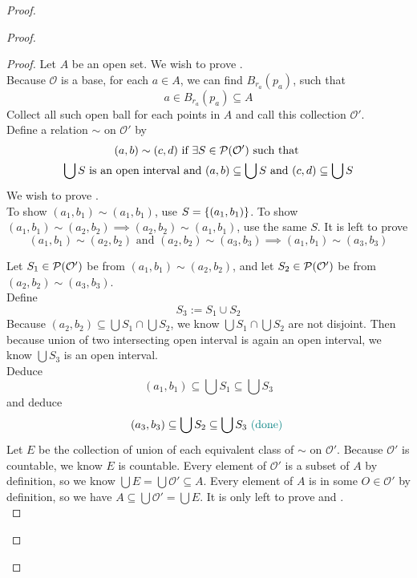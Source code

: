 \documentclass{report}
\begin{document}
\begin{proof}
\begin{proof}
\begin{proof}
Let $A$ be an open set. We wish to prove .\\


Because $\mathcal{O}$ is a base, for each $a\in A$, we can find $B_{r_a}(p_a)$, such that
\begin{equation}
a\in B_{r_a}(p_a)\subseteq A
\end{equation}
Collect all such open ball for each points in $A$ and call this collection  $\mathcal{O}'$.\\

Define a relation $\sim$ on $\mathcal{O}'$ by 
\begin{gather}
  (a,b)\sim (c,d) \text{ if }\exists S\in \mathcal{P}(\mathcal{O}')\text{ such that }\\
  \bigcup S\text{ is an open interval and }(a,b)\subseteq\bigcup S\text{ and }(c,d)\subseteq \bigcup S
\end{gather}
We wish to prove .\\

To show $(a_1,b_1)\sim (a_1,b_1)$, use $S=\{ (a_1,b_1) \}$. To show $(a_1,b_1)\sim (a_2,b_2)\implies (a_2,b_2)\sim (a_1,b_1)$, use the same $S$. It is left to prove
\begin{equation}
  (a_1,b_1)\sim (a_2,b_2)\text{ and }(a_2,b_2)\sim (a_3,b_3)\implies (a_1,b_1)\sim (a_3,b_3)
\end{equation}

Let $S_1\in \mathcal{P}(\mathcal{O}')$ be from $(a_1,b_1)\sim (a_2,b_2)$, and let $S_2\in \mathcal{P}(\mathcal{O}')$ be from $(a_2,b_2)\sim (a_3,b_3)$.\\

Define 
\begin{equation}
S_3:=S_1\cup S_2 
\end{equation}
Because $(a_2,b_2)\subseteq \bigcup S_1\cap \bigcup S_2$, we know $\bigcup S_1\cap \bigcup S_2$ are not disjoint. Then because union of two intersecting open interval is again an open interval, we know $\bigcup S_3$ is an open interval.\\

Deduce
\begin{equation}
  (a_1,b_1)\subseteq \bigcup S_1\subseteq \bigcup S_3
\end{equation}
and deduce
\begin{equation}
  (a_3,b_3)\subseteq \bigcup S_2\subseteq \bigcup S_3\textcolor{teal}{\text{ (done) }}
\end{equation}
Let $E$ be the collection of union of each equivalent class of $\sim$ on $\mathcal{O}'$. Because $\mathcal{O}'$ is countable, we know $E$ is countable. Every element of $\mathcal{O}'$ is a subset of $A$ by definition, so we know  $\bigcup E=\bigcup \mathcal{O}'\subseteq A$. Every element of $A$ is in some  $O\in \mathcal{O}'$ by definition, so we have $A\subseteq \bigcup \mathcal{O}'=\bigcup E$. It is only left to prove  and .\\


\end{proof}
\end{proof}
\end{proof}
\end{document}
